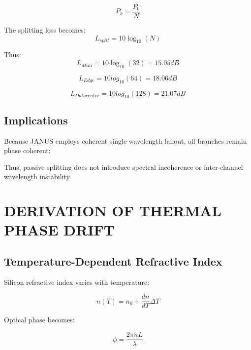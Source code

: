 \documentclass[journal]{IEEEtran}
\begin{document}
\begin{equation}
P_{k} = \frac{P_0}{N}
\end{equation}

The splitting loss becomes:
\begin{equation}
L_{split} = 10 \log_{10}(N)
\end{equation}

Thus:
\begin{equation}
L_{Mini} = 10 \log_{10}(32) = 15.05 dB
\end{equation}

\begin{equation}
L_{Edge} = 10 log_{10}(64) = 18.06 dB
\end{equation}

\begin{equation}
L_{Datacenter} = 10 log_{10}(128) = 21.07 dB
\end{equation}


\subsection{\textbf{Implications}}

Because JANUS employs coherent single-wavelength fanout, all branches remain phase coherent:

\begin{center}
\end{center}

Thus, passive splitting does not introduce spectral incoherence or inter-channel wavelength instability.

\section{DERIVATION OF THERMAL PHASE DRIFT}

\subsection{\textbf{Temperature-Dependent Refractive Index}}

Silicon refractive index varies with temperature:

\begin{equation}
n(T) = n_0 + \frac{dn}{dT} \Delta T 
\end{equation}

Optical phase becomes:

\begin{equation}
\phi = \frac{2\pi nL}{\lambda}
\end{equation}
\end{document}
